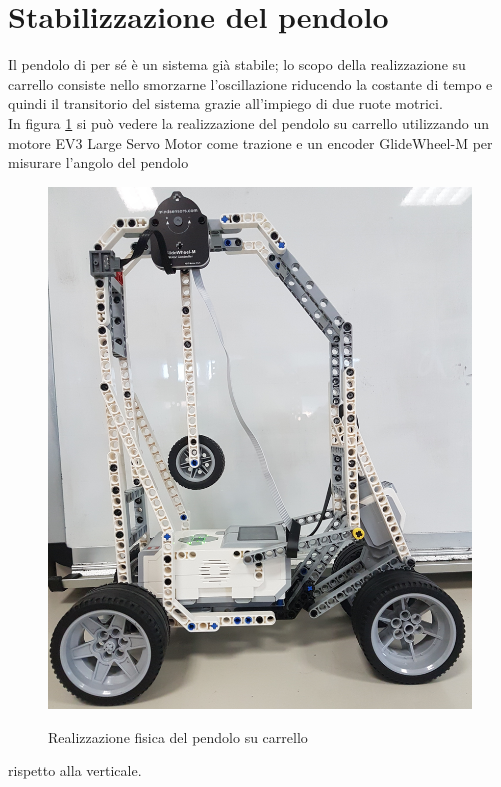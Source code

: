 \section{Stabilizzazione del pendolo}\label{stabPend}
Il pendolo di per sé è un sistema già stabile; lo scopo della realizzazione su carrello consiste nello smorzarne l'oscillazione riducendo la costante di tempo e quindi il transitorio del sistema grazie all'impiego di due ruote motrici.\\
In figura \ref{pendoloFisico} si può vedere la realizzazione del pendolo su carrello utilizzando un motore EV3 Large Servo Motor come trazione e un encoder GlideWheel-M per misurare l'angolo del pendolo 
\begin{figure}[ht]
	\centering
	\includegraphics[scale=0.08]{pendoloFisico.jpg}\\
	\caption{Realizzazione fisica del pendolo su carrello}
	\label{pendoloFisico}
\end{figure} 
rispetto alla verticale.\\

